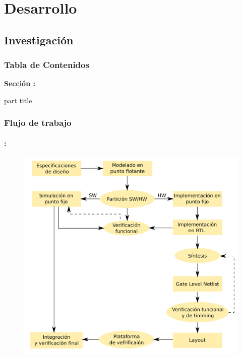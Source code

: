 \section{Desarrollo}
\subsection{Investigación}

\begin{frame}
  \frametitle{\textbf{Tabla de Contenidos}}
  \begin{center}
    {\vspace{-1.5cm}\Large \textbf{Sección \thesection: \secname }\vspace{0.5cm}}
    \begin{beamercolorbox}[
      sep=8pt,center]{part title}
      \textbf{\subsecname}
    \end{beamercolorbox}
  \end{center}
\end{frame}


\begin{frame}
  \frametitle{\textbf{Flujo de trabajo}}
      \framesubtitle{\secname : \subsecname}

  \vspace{-0.3cm}
  \begin{figure}[!t] \centering
  \includegraphics[width=0.65\paperwidth]{Diagramas/diag_flujo.png}
  \end{figure}
\end{frame}



